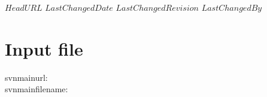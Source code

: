 \svnidlong
{$HeadURL$}
{$LastChangedDate$}
{$LastChangedRevision$}
{$LastChangedBy$}

\noindent

\section{Input file}
svnmainurl: \svnnolinkurl{\svnmainurl} \\
svnmainfilename: \svnnolinkurl{\svnmainfilename} \\

